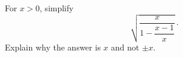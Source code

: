 For $x>0$, simplify
\[\sqrt{\dfrac{x}{1-\dfrac{x-1}{x}}}\,.\]
Explain why the answer is $x$ and not $\pm x$.
